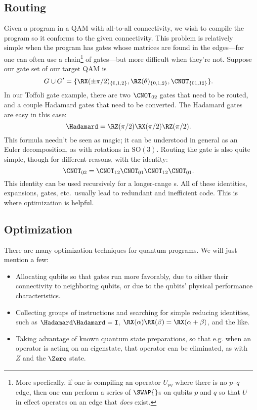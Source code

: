 \subsection{Routing}
Given a program in a QAM with all-to-all connectivity, we wish to compile the program so it conforms to the given connectivity. This problem is relatively simple when the program has gates whose matrices are found in the edges---for one can often use a chain\footnote{More specfically, if one is compiling an operator $U_{pq}$ where there is no $p$--$q$ edge, then one can perform a series of $\SWAP{}$s on qubits $p$ and $q$ so that $U$ in effect operates on an edge that \emph{does} exist.} of \SWAP{} gates---but more difficult when they're not. Suppose our gate set of our target QAM is
\begin{displaymath}
G\cup G' = \{ \RX(\pm\pi/2)_{\{0,1,2\}}, \RZ(\theta)_{\{0,1,2\}}, \CNOT_{\{01, 12\}} \}.
\end{displaymath}
In our Toffoli gate example, there are two $\CNOT_{02}$ gates that need to be routed, and a couple Hadamard gates that need to be converted. The Hadamard gates are easy in this case:
\begin{equation*}
\Hadamard = \RZ(\pi/2)\RX(\pi/2)\RZ(\pi/2).
\end{equation*}
This formula needn't be seen as magic; it can be understood in general as an Euler decomposition, as with rotations in $\mathrm{SO}(3)$. Routing the \CNOT{} gate is also quite simple, though for different reasons, with the identity:
\begin{equation*}
    \CNOT_{02}=\CNOT_{12}\CNOT_{01}\CNOT_{12}\CNOT_{01}.
\end{equation*}
This identity can be used recursively for a longer-range \CNOT{}s.
All of these identities, expansions, \SWAP{} gates, etc.\ usually lead to redundant and inefficient code. This is where optimization is helpful.

\subsection{Optimization}
There are many optimization techniques for quantum programs. We will just mention a few:
\begin{itemize}
    \item Allocating qubits so that gates run more favorably, due to either their connectivity to neighboring qubits, or due to the qubits' physical performance characteristics\cite{noisycomp}.
    \item Collecting groups of instructions and searching for simple reducing identities, such as $\Hadamard \Hadamard=\mathtt{I}$, $\RX(\alpha)\RX(\beta)=\RX(\alpha+\beta)$, and the like.
    \item Taking advantage of known quantum state preparations, so that e.g. when an operator is acting on an eigenstate, that operator can be eliminated, as with $Z$ and the $\Zero$ state.
\end{itemize}

